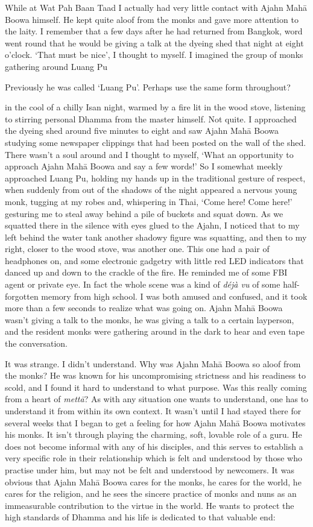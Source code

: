 While at Wat Pah Baan Taad I actually had very little contact with Ajahn
Mahā Boowa himself. He kept quite aloof from the monks and gave more
attention to the laity. I remember that a few days after he had returned
from Bangkok, word went round that he would be giving a talk at the
dyeing shed that night at eight o'clock. `That must be nice', I thought
to myself. I imagined the group of monks gathering around Luang Pu

Previously he was called `Luang Pu'. Perhaps use the same form
throughout?

in the cool of a chilly Isan night, warmed by a fire lit in the wood
stove, listening to stirring personal Dhamma from the master himself.
Not quite. I approached the dyeing shed around five minutes to eight and
saw Ajahn Mahā Boowa studying some newspaper clippings that had been
posted on the wall of the shed. There wasn't a soul around and I thought
to myself, `What an opportunity to approach Ajahn Mahā Boowa and say a
few words!' So I somewhat meekly approached Luang Pu, holding my hands
up in the traditional gesture of respect, when suddenly from out of the
shadows of the night appeared a nervous young monk, tugging at my robes
and, whispering in Thai, `Come here! Come here!' gesturing me to steal
away behind a pile of buckets and squat down. As we squatted there in
the silence with eyes glued to the Ajahn, I noticed that to my left
behind the water tank another shadowy figure was squatting, and then to
my right, closer to the wood stove, was another one. This one had a pair
of headphones on, and some electronic gadgetry with little red LED
indicators that danced up and down to the crackle of the fire. He
reminded me of some FBI agent or private eye. In fact the whole scene
was a kind of \emph{déjà vu} of some half-forgotten memory from high
school. I was both amused and confused, and it took more than a few
seconds to realize what was going on. Ajahn Mahā Boowa wasn't giving a
talk to the monks, he was giving a talk to a certain layperson, and the
resident monks were gathering around in the dark to hear and even tape
the conversation.

It was strange. I didn't understand. Why was Ajahn Mahā Boowa so aloof
from the monks? He was known for his uncompromising strictness and his
readiness to scold, and I found it hard to understand to what purpose.
Was this really coming from a heart of \emph{mettā}? As with any
situation one wants to understand, one has to understand it from within
its own context. It wasn't until I had stayed there for several weeks
that I began to get a feeling for how Ajahn Mahā Boowa motivates his
monks. It isn't through playing the charming, soft, lovable role of a
guru. He does not become informal with any of his disciples, and this
serves to establish a very specific role in their relationship which is
felt and understood by those who practise under him, but may not be felt
and understood by newcomers. It was obvious that Ajahn Mahā Boowa cares
for the monks, he cares for the world, he cares for the religion, and he
sees the sincere practice of monks and nuns as an immeasurable
contribution to the virtue in the world. He wants to protect the high
standards of Dhamma and his life is dedicated to that valuable end:

